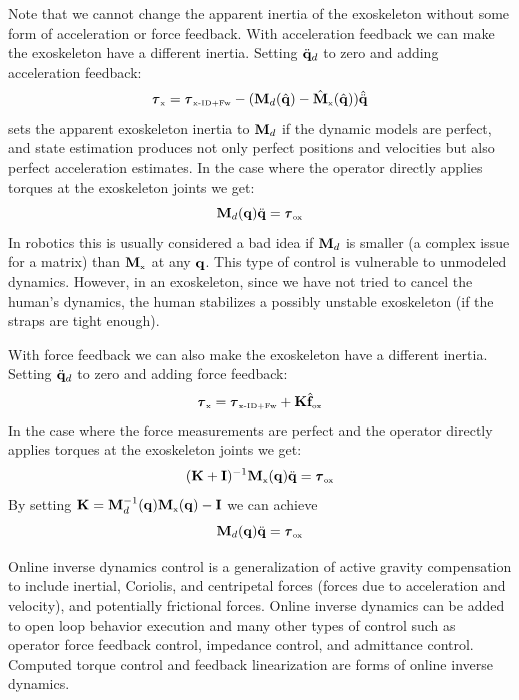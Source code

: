 \documentclass[letterpaper,12pt,fullpage]{article}
\newcommand{\myx}{{\mbox {\tiny x}}}
\newcommand{\ox}{{\mbox {\tiny ox}}}
\newcommand{\xinvdynw}{{\mbox {\tiny x-ID+Fw}}}
\begin{document}
Note that we cannot change the apparent inertia of the exoskeleton without
some form of acceleration or force feedback.
With acceleration feedback we can make the exoskeleton have a different inertia.
Setting $\ddot{{\bf q}}_d$ to zero and adding acceleration feedback:
\begin{equation}
\vtau_{\myx} = \vtau_{\xinvdynw} - (\mM_d(\hat{\vq}) - \hat{\mM}_{\myx}(\hat{\vq})) \hat{\ddot{\vq}}
\label{eq:change-inertia1}
\end{equation}
sets the apparent exoskeleton inertia to ${\bf M}_d$ if the dynamic models are perfect, and
state estimation produces not only perfect positions and velocities but
also perfect acceleration estimates. In the case 
where the operator directly applies torques at the
exoskeleton joints we get:
\begin{equation}
\mM_d (\vq) \ddot{\vq} = \vtau_{\ox}
\end{equation}
In robotics this is usually considered a bad idea if ${\bf M}_d$ is smaller (a complex
issue for a matrix) than $\mM_{\myx}$ at any ${\bf q}$. This type of control is vulnerable
to unmodeled dynamics. However, in an exoskeleton, since we have not tried to
cancel the human's dynamics, the human stabilizes a possibly unstable exoskeleton
(if the straps are tight enough).

With force feedback we can also make the exoskeleton have a different inertia.
Setting $\ddot{{\bf q}}_d$ to zero and adding force feedback:
\begin{equation}
\vtau_{\myx} = \vtau_{\xinvdynw} + \mK \hat{\vf}_{\ox}
\end{equation}
In the case where the force measurements are perfect and 
the operator directly applies torques at the
exoskeleton joints we get:
\begin{equation}
(\mK + \mI)^{-1} \mM_{\myx} (\vq) \ddot{\vq} = \vtau_{\ox}
\end{equation}
By setting $\mK = \mM^{-1}_d (\vq) \mM_{\myx} (\vq) - \mI$ we can achieve
\begin{equation}
\mM_d (\vq) \ddot{\vq} = \vtau_{\ox}
\end{equation}

Online inverse dynamics control is a generalization of 
active gravity compensation to include
inertial, Coriolis, and centripetal forces (forces due to acceleration and
velocity), and potentially frictional forces.
Online inverse dynamics can be added to open loop behavior execution
and many other types of control such as operator force
feedback control, impedance control, and admittance control.
Computed torque control and feedback linearization are forms of online
inverse dynamics.
\end{document}
